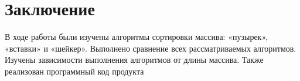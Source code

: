 \documentclass[12pt]{report}
\begin{document}
\chapter*{Заключение}
В ходе работы были изучены алгоритмы сортировки массива: «пузырек», «вставки» и «шейкер». Выполнено сравнение всех рассматриваемых алгоритмов. Изучены зависимости выполнения алгоритмов от длины массива. Также реализован программный код продукта
\end{document}
